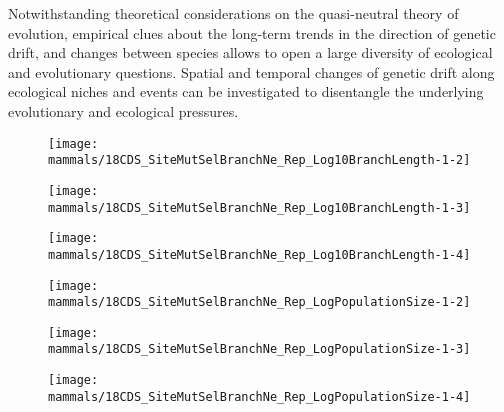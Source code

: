 Notwithstanding theoretical considerations on the quasi-neutral theory of evolution, empirical clues about the long-term trends in the direction of genetic drift, and changes between species allows to open a large diversity of ecological and evolutionary questions.
Spatial and temporal changes of genetic drift along ecological niches and events can be investigated to disentangle the underlying evolutionary and ecological pressures.

\begin{figure}[htbp]
    \centering
    \begin{minipage}{0.32\linewidth}
        \texttt{[image: mammals/18CDS\_SiteMutSelBranchNe\_Rep\_Log10BranchLength-1-2]}
    \end{minipage}
    \hfill
    \begin{minipage}{0.32\linewidth}
        \texttt{[image: mammals/18CDS\_SiteMutSelBranchNe\_Rep\_Log10BranchLength-1-3]}
    \end{minipage}
    \hfill
    \begin{minipage}{0.32\linewidth}
        \texttt{[image: mammals/18CDS\_SiteMutSelBranchNe\_Rep\_Log10BranchLength-1-4]}
    \end{minipage}
    \hfill
    \begin{minipage}{0.32\linewidth}
        \texttt{[image: mammals/18CDS\_SiteMutSelBranchNe\_Rep\_LogPopulationSize-1-2]}
    \end{minipage}
    \hfill
    \begin{minipage}{0.32\linewidth}
        \texttt{[image: mammals/18CDS\_SiteMutSelBranchNe\_Rep\_LogPopulationSize-1-3]}
    \end{minipage}
    \hfill
    \begin{minipage}{0.32\linewidth}
        \texttt{[image: mammals/18CDS\_SiteMutSelBranchNe\_Rep\_LogPopulationSize-1-4]}
    \end{minipage}
    \hfill

\end{figure}
